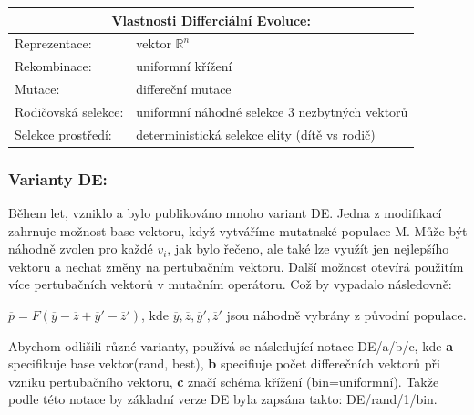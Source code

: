 \begin{center}
\begin{tabular}{ l l }
    \multicolumn{2}{c}{Vlastnosti Differciální Evoluce:} \\
    \hline \hline
    Reprezentace: & vektor $\mathbb{R}^n$ \\
    \hline  
    Rekombinace: & uniformní křížení \\
    \hline  
    Mutace: & differeční mutace \\
    \hline   
    Rodičovská selekce: & uniformní náhodné selekce 3 nezbytných vektorů \\
    \hline   
    Selekce prostředí: & deterministická selekce elity (dítě vs rodič) \\
  \end{tabular}
\end{center} \par
\subsubsection{Varianty DE:}
Během let, vzniklo a bylo publikováno mnoho variant DE. Jedna z modifikací zahrnuje možnost base vektoru, když vytváříme mutatnské populace M. Může být náhodně zvolen pro každé $v_i$, jak bylo řečeno, ale také lze využít jen nejlepšího vektoru a nechat změny na pertubačním vektoru. Další možnost otevírá použitím více pertubačních vektorů v mutačním operátoru. Což by vypadalo následovně: \par
$\overline{p} = F (\overline{y}-\overline{z} + \overline{y}' - \overline{z}')$, kde $\overline{y}, \overline{z}, \overline{y}',\overline{z}'$ jsou náhodně vybrány z původní populace.\par
Abychom odlišili různé varianty, používá se následující notace DE/a/b/c, kde \textbf{a} specifikuje base vektor(rand, best), \textbf{b} specifiuje počet differečních  vektorů při vzniku pertubačního vektoru, \textbf{c} značí schéma křížení (bin=uniformní). Takže podle této notace by základní verze DE byla zapsána takto: DE/rand/1/bin. 
